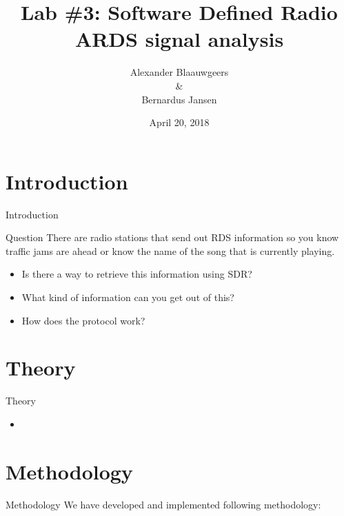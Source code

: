 \documentclass[10pt]{beamer}
\title[]{Lab \#3: Software Defined Radio \\ ARDS signal analysis } %
\author{Alexander Blaauwgeers \\ \& \\ Bernardus Jansen} %
\institute[University of Amsterdam] %
{
University of Amsterdam \\ %
\medskip
}
\date{April 20, 2018} %
\begin{document}
\begin{frame}
\titlepage %
\end{frame}

\section{Introduction }
\begin{frame}{Introduction}
\begin{block}{Question}
There are radio stations that send out RDS information so you know traffic jams are ahead or know the name of the
song that is currently playing.
\begin{itemize}
    \item Is there a way to retrieve this information using SDR?
    \item What kind of information can you get out of this?
    \item How does the protocol work?
\end{itemize}
\end{block}
\end{frame}

\section{Theory}
\begin{frame}{Theory}
\centering
\begin{itemize}
    \item 
\end{itemize}

\end{frame}

\section{Methodology}
\begin{frame}{Methodology}{}
We have developed and implemented following methodology:

\end{frame}

\end{document}
